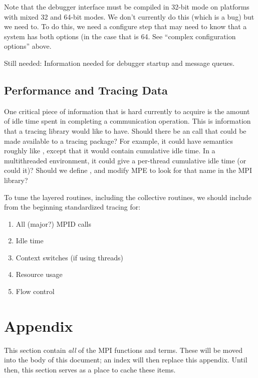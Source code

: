 \documentclass{article}
\begin{document}
Note that the debugger interface must be compiled in 32-bit mode on
platforms with mixed 32 and 64-bit modes.  We don't currently do this
(which is a bug) but we need to.  To do this, we need a configure step
that may need to know that a system has both options (in the case that
 is 64.  See ``complex configuration
options'' above.

Still needed: Information needed for debugger startup and message
queues.

\subsection{Performance and Tracing Data}

One critical piece of information that is hard currently to acquire is
the amount of idle time spent in completing a communication operation.
This is information that a tracing library would like to have.  Should
there be an  call that could be made available to a tracing
package?  For example, it could have semantics roughly like
, except that it would contain cumulative idle time.  In a
multithreaded environment, it could give a per-thread cumulative idle
time (or could it)?  Should we define , and modify MPE
to look for that name in the MPI library?

To tune the layered routines, including the collective routines, we
should include from the beginning standardized tracing for:
\begin{enumerate}
\item All (major?) MPID calls
\item Idle time
\item Context switches (if using threads)
\item Resource usage
\item Flow control
\end{enumerate}


\section{Appendix}
This section contain \emph{all} of the MPI functions and terms.  These
will be moved into the body of this document; an index will then
replace this appendix.  Until then, this section serves as a place to
cache these items.
\end{document}
